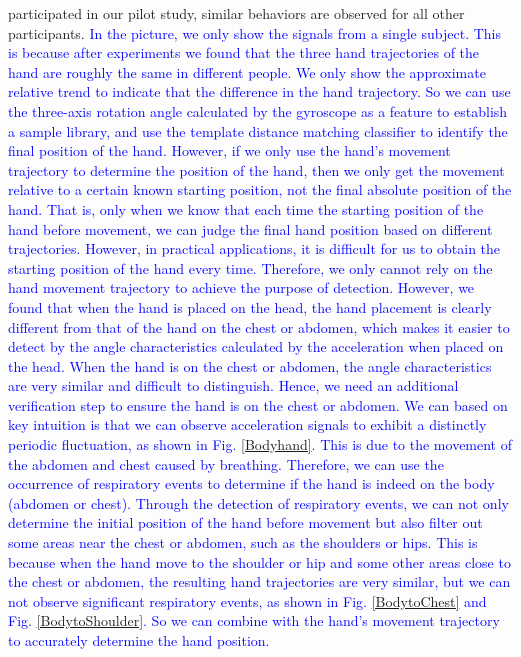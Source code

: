 participated in our pilot study, similar behaviors are observed for all other participants. \textcolor{blue}{In the picture, we only show
the signals from a single subject. This is because after experiments we found that the three hand trajectories of the hand are roughly the
same in different people. We only show the approximate relative trend to indicate that the difference in the hand trajectory. So we can use
the three-axis rotation angle calculated by the gyroscope as a feature to establish a sample library, and use the template distance
matching classifier to identify the final position of the hand. However, if we only use the hand's movement trajectory to determine the
position of the hand, then we only get the movement relative to a certain known starting position, not the final absolute position of the
hand. That is, only when we know that each time the starting position of the hand before movement, we can judge the final hand position
based on different trajectories. However, in practical applications, it is difficult for us to obtain the starting position of the hand
every time. Therefore, we only cannot rely on the hand movement trajectory to achieve the purpose of detection. However, we found that when
the hand is placed on the head, the hand placement is clearly different from that of the hand on the chest or abdomen, which makes it
easier to detect by the angle characteristics calculated by the acceleration when placed on the head. When the hand is on the chest or
abdomen, the angle characteristics are very similar and difficult to distinguish. Hence, we need an additional verification step to ensure
the hand is on the chest or abdomen. We can based on key intuition is that we can observe acceleration signals to exhibit a distinctly
periodic fluctuation, as shown in Fig. \ref{Bodyhand}. This is due to the movement of the abdomen and chest caused by breathing. Therefore,
we can use the occurrence of respiratory events to determine if the hand is indeed on the body (abdomen or chest). Through the detection of
respiratory events, we can not only determine the initial position of the hand before movement but also filter out some areas near the
chest or abdomen, such as the shoulders or hips. This is because when the hand move to the shoulder or hip and some other areas close to
the chest or abdomen, the resulting hand trajectories are very similar, but we can not observe significant respiratory events, as shown in
Fig. \ref{BodytoChest} and Fig. \ref{BodytoShoulder}. So we can combine with the hand's
movement trajectory to accurately determine the hand position.}%
